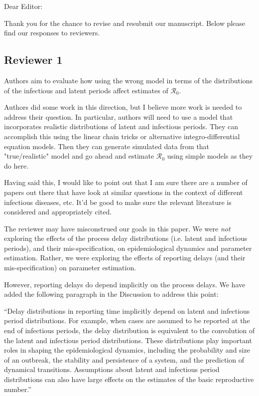\documentclass[12pt]{article}
\newcommand{\rev}{\subsection*}
\newcommand{\revtext}{\textsf}
\begin{document}
\noindent Dear Editor:

Thank you for the chance to revise and resubmit our manuscript. 
Below please find our responses to reviewers.

\rev{Reviewer 1}

\revtext{Authors aim to evaluate how using the wrong model in terms of the distributions of the infectious and latent periods affect estimates of $\mathcal R_0$.}

\revtext{Authors did some work in this direction, but I believe more work is needed to address their question. In particular, authors will need to use a model that incorporates realistic distributions of latent and infectious periods. They can accomplish this using the linear chain tricks or alternative integro-differential equation models. Then they can generate simulated data from that "true/realistic" model and go ahead and estimate $\mathcal R_0$ using simple models as they do here.}

\revtext{Having said this, I would like to point out that I am sure there are a number of papers out there that have look at similar questions in the context of different infectious diseases, etc. It'd be good to make sure the relevant literature is considered and appropriately cited.}

The reviewer may have misconstrued our goals in this paper. We were \emph{not} exploring the effects of the process delay distributions (i.e. latent and infectious periods), and their mis-specification, on epidemiological dynamics and parameter estimation. Rather, we were exploring the effects of reporting delays (and their mis-specification) on parameter estimation.

However, reporting delays do depend implicitly on the process delays. We have added the following paragraph in the Discussion to address this point:

``Delay distributions in reporting time implicitly depend on latent and infectious 
period distributions. For example, when cases are assumed to be reported
at the end of infectious periods,
the delay distribution is equivalent to the convolution of the latent and
infectious period distributions. These distributions play important roles in 
shaping the epidemiological dynamics, including the probability and size of an outbreak, 
the stability and persistence of a system, and the 
prediction of dynamical transitions. Assumptions about
latent and infectious period distributions can also have large effects on the
estimates of the basic reproductive number.''
\end{document}
